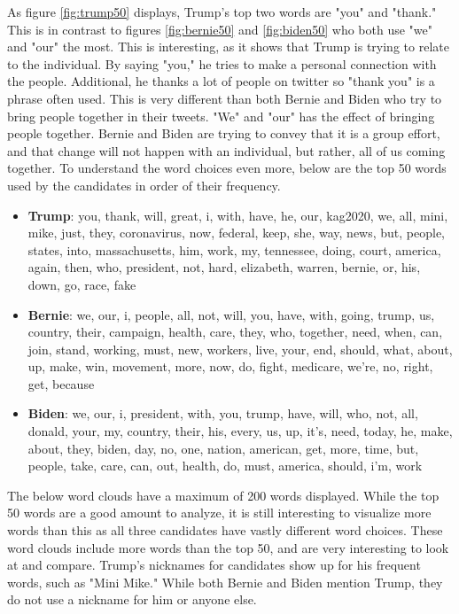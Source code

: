 \documentclass{article}
\begin{document}
As figure \ref{fig:trump50} displays, Trump's top two words are "you" and "thank." This is in contrast to figures \ref{fig:bernie50} and \ref{fig:biden50} who both use "we" and "our" the most. This is interesting, as it shows that Trump is trying to relate to the individual. By saying "you," he tries to make a personal connection with the people. Additional, he thanks a lot of people on twitter so "thank you" is a phrase often used. This is very different than both Bernie and Biden who try to bring people together in their tweets. "We" and "our" has the effect of bringing people together. Bernie and Biden are trying to convey that it is a group effort, and that change will not happen with an individual, but rather, all of us coming together.\newline
To understand the word choices even more, below are the top 50 words used by the candidates in order of their frequency. 
\begin{itemize}
    \item \textbf{Trump}: you, thank, will, great, i, with, have, he, our, kag2020, we, all, mini, mike, just, they, coronavirus, now, federal, keep, she, way, news, but, people, states, into, massachusetts, him, work, my, tennessee, doing, court, america, again, then, who, president, not, hard, elizabeth, warren, bernie, or, his, down, go, race, fake
    \item \textbf{Bernie}: we, our, i, people, all, not, will, you, have, with, going, trump, us, country, their, campaign, health, care, they, who, together, need, when, can, join, stand, working, must, new, workers, live, your, end, should, what, about, up, make, win, movement, more, now, do, fight, medicare, we're, no, right, get, because
    \item \textbf{Biden}: we, our, i, president, with, you, trump, have, will, who, not, all, donald, your, my, country, their, his, every, us, up, it's, need, today, he, make, about, they, biden, day, no, one, nation, american, get, more, time, but, people, take, care, can, out, health, do, must, america, should, i'm, work
\end{itemize}

The below word clouds have a maximum of 200 words displayed. While the top 50 words are a good amount to analyze, it is still interesting to visualize more words than this as all three candidates have vastly different word choices. These word clouds include more words than the top 50, and are very interesting to look at and compare. Trump's nicknames for candidates show up for his frequent words, such as "Mini Mike." While both Bernie and Biden mention Trump, they do not use a nickname for him or anyone else.
\end{document}
